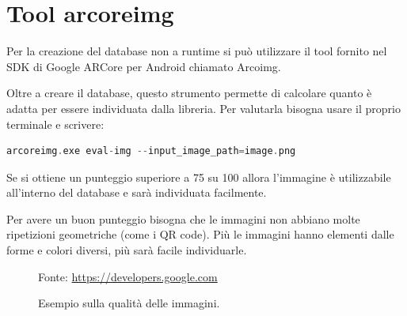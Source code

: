 \documentclass[crop=false, class=book]{standalone}
\begin{document}
	\section{Tool arcoreimg}	
	
	Per la creazione del database non a runtime si può utilizzare il tool fornito nel SDK di Google ARCore 	per Android chiamato Arcoimg.
	
	Oltre a creare il database, questo strumento permette di calcolare quanto è adatta per essere individuata dalla libreria.
	Per valutarla bisogna usare il proprio terminale e scrivere:
	\begin{center}
	
	\begin{minipage}{0.95\textwidth}
	\begin{lstlisting}[caption={Valutazione delle immagini}, label={lst:ai_session}, language=Kotlin]
	   arcoreimg.exe eval-img --input_image_path=image.png
	  \end{lstlisting}
	\end{minipage}
	\end{center}
	
	Se si ottiene un punteggio superiore a 75 su 100 allora l'immagine è utilizzabile all'interno del database e sarà individuata facilmente.
	
	Per avere un buon punteggio bisogna che le immagini non abbiano molte ripetizioni geometriche (come i QR code). Più le immagini hanno elementi dalle forme e colori diversi, più sarà facile individuarle.
	
	
	
	\begin{center}
		\begin{figure}
			\centering
			{Fonte: \url{https://developers.google.com}}
			\caption{Esempio sulla qualità delle immagini.}
			\label{fig:env_und}
		\end{figure}
	\end{center}
	
\end{document}
